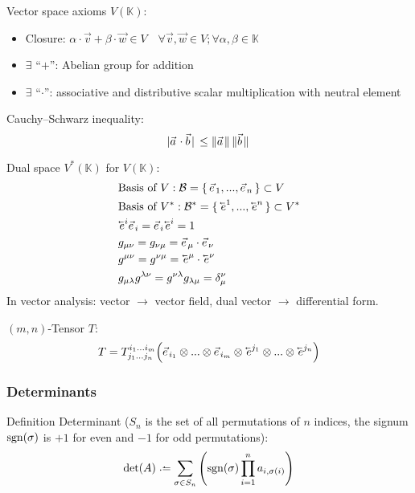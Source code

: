 			\noindent
			Vector space axioms $V(\mathbb{K})$:
			\begin{itemize}
				\item Closure: $\alpha \cdot \vec{v} + \beta \cdot \vec{w} \in V \quad \forall \vec{v}, \vec{w} \in V; \forall \alpha, \beta \in \mathbb{K}$
				\item $\exists$ ``$+$'': Abelian group for addition
				\item $\exists$ ``$\cdot$'': associative and distributive scalar multiplication with neutral element
			\end{itemize}

			\noindent
			Cauchy--Schwarz inequality:
			\begin{equation}
				\abs*{\vec{a}\cdot\vec{b}} \le \norm*{\vec{a}}\norm*{\vec{b}}
			\end{equation}

			\noindent
			Dual space $V^{*}(\mathbb{K})$ for $V(\mathbb{K})$:
			\begin{equation}
				\begin{aligned}
					&\text{Basis of $V$}: \mathcal{B} = \set{ \vec{e}_1,...,\vec{e}_n } \subset V \\
					&\text{Basis of $V^{*}$}: \mathcal{B}^{*} = \set{ \cev{e}^1,...,\cev{e}^n } \subset V^{*} \\
					&\cev{e}^i \vec{e}_i = \vec{e}_i \cev{e}^i = 1 \\
					&g_{\mu\nu} = g_{\nu\mu} = \vec{e}_\mu\cdot\vec{e}_\nu\\
					&g^{\mu\nu} = g^{\nu\mu} = \cev{e}^\mu\cdot\cev{e}^\nu \\
					&g_{\mu\lambda} g^{\lambda\nu} = g^{\nu\lambda}g_{\lambda\mu} = \delta_\mu^\nu \\
				\end{aligned}
			\end{equation}
			In vector analysis: vector $\to$ vector field, dual vector $\to$ differential form.

			\noindent 
			$(m,n)$-Tensor $T$: 
			\begin{equation}
				T = T^{i_1...i_m}_{j_1...j_n} \qty(\vec{e}_{i_1}\otimes...\otimes\vec{e}_{i_m}\otimes\cev{e}^{j_1}\otimes...\otimes\cev{e}^{j_n})
			\end{equation}


		\subsubsection{Determinants}
			Definition Determinant ($S_n$ is the set of all permutations of $n$ indices, the signum $\mathrm{sgn}(\sigma)$ is $+1$ for even and $-1$ for odd permutations):
			\begin{equation}
				\det(A) \defeq \sum_{\sigma\in S_n}\qty(\sgn(\sigma)\prod_{i=1}^{n} a_{i,\sigma(i)})
			\end{equation}

